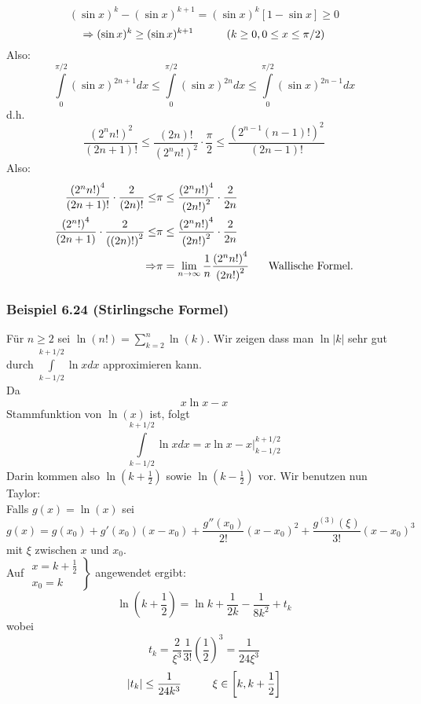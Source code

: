 \[{(\sin x)^k} - {(\sin x)^{k + 1}} = {(\sin x)^k}\left[ {1 - \sin x} \right] \ge 0\]
\[ \Rightarrow {(\sin x)^k} \geq {(\sin x)^{k + 1}}\text{\hspace{10mm}} \left( k\geq 0,0\leq x \leq \pi/2\right)\]
Also:
\[\int\limits_0^{\pi /2} {{{(\sin x)}^{2n + 1}}dx \le \int\limits_0^{\pi /2} {{{(\sin x)}^{2n}}dx \le \int\limits_0^{\pi /2} {{{(\sin x)}^{2n - 1}}dx} } } \]
d.h.
\[\frac{{{{({2^n} n!)}^2}}}{{(2n + 1)!}} \le \frac{{(2n)!}}{{{{({2^n}n!)}^2}}} \cdot \frac{\pi }{2} \le \frac{{{{\left( {{2^{n - 1}}(n - 1)!} \right)}^2}}}{{(2n - 1)!}}\]
Also:
\begin{align*}
\frac{{{{({2^n}n!)}^4}}}{{(2n + 1)!}} \cdot \frac{2}{{(2n)!}} \le&\pi  \le \frac{{{{({2^n}n!)}^4}}}{{{{(2n!)}^2}}} \cdot \frac{2}{{2n}}\\
\frac{{{{({2^n}!)}^4}}}{{(2n + 1)}} \cdot \frac{2}{{{{((2n)!)}^2}}} \le&\pi  \le \frac{{{{({2^n}n!)}^4}}}{{{{(2n!)}^2}}} \cdot \frac{2}{{2n}}\\
 \Rightarrow &\pi  = \mathop {\lim }\limits_{n \to \infty } \frac{1}{n}\frac{{{{({2^n}n!)}^4}}}{{{{(2n!)}^2}}}\text{\hspace{5mm} Wallische Formel.}
\end{align*}

\subsubsection*{Beispiel 6.24 (Stirlingsche Formel)}
Für $n\geq 2$ sei $\ln (n!) = \sum\limits_{k = 2}^n {\ln (k)} $. Wir zeigen dass man $\ln\left| k\right|$ sehr gut durch $\int\limits_{k - 1/2}^{k + 1/2} {\ln xdx} $ approximieren kann.\\

\noindent Da \[x\ln x-x\] Stammfunktion von $\ln(x)$ ist, folgt \[\int\limits_{k - 1/2}^{k + 1/2} {\ln xdx}  = \left. {x\ln x - x} \right|_{k - 1/2}^{k + 1/2}\] Darin kommen also $\ln\left(k+\frac{1}{2}\right)$ sowie $\ln\left(k-\frac{1}{2}\right)$ vor. Wir benutzen nun Taylor:\\

\noindent Falls $g(x)=\ln(x)$ sei \[g(x)=g(x_0)+g'(x_0)(x-x_0)+\frac{g''(x_0)}{2!}(x-x_0)^2+\frac{g^{(3)}(\xi)}{3!}(x-x_0)^3\] mit $\xi$ zwischen $x$ und $x_0$.\\

\noindent Auf $\left. {\begin{array}{*{20}{c}}
{x = k + \frac{1}{2}}\\
{{x_0} = k}
\end{array}} \right\}$ angewendet ergibt:
\[\ln \left( {k + \frac{1}{2}} \right) = \ln k + \frac{1}{{2k}} - \frac{1}{{8{k^2}}} + {t_k}\]
wobei \[{t_k} = \frac{2}{{{\xi ^3}}}\frac{1}{{3!}}{\left( {\frac{1}{2}} \right)^3} = \frac{1}{{24{\xi ^3}}}\]
\[\left| {{t_k}} \right| \le \frac{1}{{24{k^3}}}\text{\hspace{10mm}}\xi  \in \left[ {k,k + \frac{1}{2}} \right]\]

